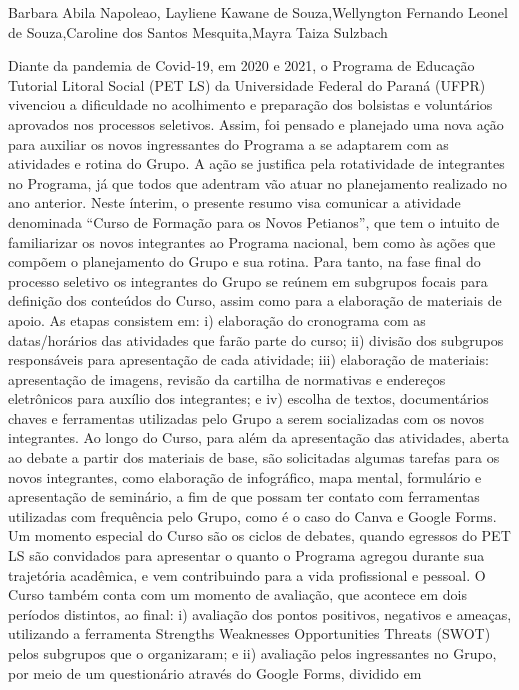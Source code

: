 Barbara Abila Napoleao, Layliene Kawane de Souza,Wellyngton Fernando Leonel de  Souza,Caroline dos Santos Mesquita,Mayra Taiza Sulzbach

Diante da pandemia de Covid-19, em 2020 e 2021, o Programa de Educação Tutorial Litoral 
Social (PET LS) da Universidade Federal do Paraná (UFPR) vivenciou a dificuldade no 
acolhimento e preparação dos bolsistas e voluntários aprovados nos processos seletivos. Assim, 
foi pensado e planejado uma nova ação para auxiliar os novos ingressantes do Programa a se 
adaptarem com as atividades e rotina do Grupo. A ação se justifica pela rotatividade de 
integrantes no Programa, já que todos que adentram vão atuar no planejamento realizado no ano 
anterior. Neste ínterim, o presente resumo visa comunicar a atividade denominada “Curso de 
Formação para os Novos Petianos”, que tem o intuito de familiarizar os novos integrantes ao 
Programa nacional, bem como às ações que compõem o planejamento do Grupo e sua rotina. 
Para tanto, na fase final do processo seletivo os integrantes do Grupo se reúnem em subgrupos
focais para definição dos conteúdos do Curso, assim como para a elaboração de materiais de 
apoio. As etapas consistem em: i) elaboração do cronograma com as datas/horários das 
atividades que farão parte do curso; ii) divisão dos subgrupos responsáveis para apresentação de 
cada atividade; iii) elaboração de materiais: apresentação de imagens, revisão da cartilha de 
normativas e endereços eletrônicos para auxílio dos integrantes; e iv) escolha de textos,
documentários chaves e ferramentas utilizadas pelo Grupo a serem socializadas com os novos 
integrantes. Ao longo do Curso, para além da apresentação das atividades, aberta ao debate a 
partir dos materiais de base, são solicitadas algumas tarefas para os novos integrantes, como 
elaboração de infográfico, mapa mental, formulário e apresentação de seminário, a fim de que 
possam ter contato com ferramentas utilizadas com frequência pelo Grupo, como é o caso do 
Canva e Google Forms. Um momento especial do Curso são os ciclos de debates, quando
egressos do PET LS são convidados para apresentar o quanto o Programa agregou durante sua 
trajetória acadêmica, e vem contribuindo para a vida profissional e pessoal. O Curso também 
conta com um momento de avaliação, que acontece em dois períodos distintos, ao final: i) 
avaliação dos pontos positivos, negativos e ameaças, utilizando a ferramenta Strengths 
Weaknesses Opportunities Threats (SWOT) pelos subgrupos que o organizaram; e ii) avaliação 
pelos ingressantes no Grupo, por meio de um questionário através do Google Forms, dividido em 
